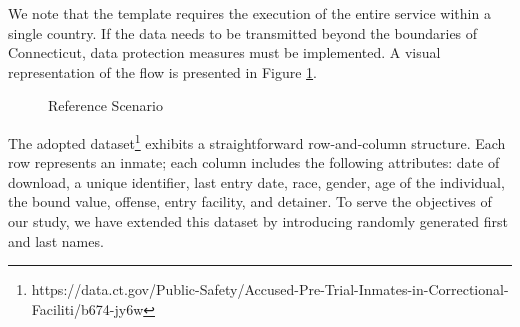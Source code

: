 We note that the template requires the execution of the entire service within a single country.
If the data needs to be transmitted beyond the boundaries of Connecticut, data protection measures must be implemented.
A visual representation of the flow is presented in Figure \ref{fig:reference_scenario}.
\begin{figure}[ht!]
  \centering
  \caption{Reference Scenario}
  \label{fig:reference_scenario}
\end{figure}

The adopted dataset\footnote{https://data.ct.gov/Public-Safety/Accused-Pre-Trial-Inmates-in-Correctional-Faciliti/b674-jy6w} exhibits a straightforward row-and-column structure.
Each row represents an inmate; each column includes the following attributes: date of download, a unique identifier, last entry date, race, gender, age of the individual, the bound value, offense, entry facility, and detainer.
To serve the objectives of our study, we have extended this dataset by introducing randomly generated first and last names.


